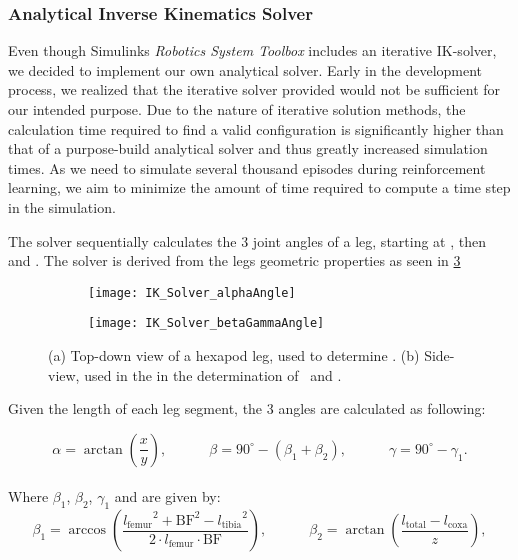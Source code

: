 \subsubsection{Analytical Inverse Kinematics Solver} \label{subsubsec: IK Solver}
Even though Simulinks \textit{Robotics System Toolbox} includes an iterative IK-solver, we decided to implement our own analytical solver.
Early in the development process, we realized that the iterative solver provided would not be sufficient for our intended purpose.
Due to the nature of iterative solution methods, the calculation time required to find a valid configuration is significantly higher than that of a purpose-build analytical solver and thus greatly increased simulation times.
As we need to simulate several thousand episodes during reinforcement learning, we aim to minimize the 
amount of time required to compute a time step in the simulation.

The solver sequentially calculates the 3 joint angles of a leg, starting at \textalpha, then \textbeta and \textgamma.
The solver is derived from the legs geometric properties as seen in \ref{figure: IK angle derivations}

\begin{figure}[h]
	\begin{subfigure}{.5\textwidth} %
		\centering
		\texttt{[image: IK\_Solver\_alphaAngle]}  %
		\caption{}
		\label{figure: IK Solver Alpha Angle}
	\end{subfigure}
	\begin{subfigure}{.5\textwidth}
		\centering
		\texttt{[image: IK\_Solver\_betaGammaAngle]}  
		\caption{}
		\label{figure: IK Solver Beta/Gamma Angle}
	\end{subfigure}
	\caption[Angle derivation drawings]{(a) Top-down view of a hexapod leg, used to determine \textalpha. (b) Side-view, used in the in the determination of \textbeta \ and \textgamma.}
	\label{figure: IK angle derivations}
\end{figure}


 Given the length of each leg segment, the 3 angles are calculated as following:

\[
	\alpha = \arctan(\frac{x}{y}) ,\quad \quad \quad \beta = 90^{\circ} - (\beta_1 + \beta_2) ,\quad \quad \quad \gamma = 90^{\circ} - \gamma_1.
\]
\\
Where $\beta_1$, $\beta_2$, $\gamma_1$ and  are given by:
\[	
	\beta_1 = \arccos(\frac{{l_\text{femur}}^2 + \text{BF}^2 - {l_\text{tibia}}^2}  {2\cdot l_\text{femur} \cdot \text{BF}}) ,\quad \quad \quad \beta_2 = \arctan(\frac{ l_\text{total} - l_\text{coxa}} {z}),
\]

